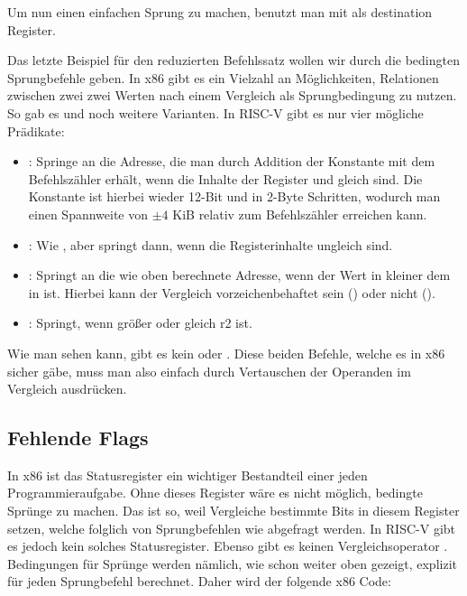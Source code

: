 Um nun einen einfachen Sprung zu machen, benutzt man  mit  als
destination Register.

Das letzte Beispiel für den reduzierten Befehlssatz wollen wir durch die
bedingten Sprungbefehle geben. In x86 gibt es ein Vielzahl an Möglichkeiten,
Relationen zwischen zwei zwei Werten nach einem Vergleich als Sprungbedingung zu
nutzen. So gab es  und noch weitere Varianten. In
RISC-V gibt es nur vier mögliche Prädikate:

\begin{itemize}
  \item {}: Springe an die Adresse, die man durch
    Addition der Konstante  mit dem Befehlszähler erhält, wenn
    die Inhalte der Register  und  gleich sind. Die Konstante
    ist hierbei wieder 12-Bit und in 2-Byte Schritten, wodurch man einen
    Spannweite von $\pm 4$ KiB relativ zum Befehlszähler erreichen kann.
  \item {}: Wie , aber springt dann, wenn
    die Registerinhalte ungleich sind.
  \item {}: Springt an die wie oben berechnete
    Adresse, wenn der Wert in  kleiner dem in  ist. Hierbei
    kann der Vergleich vorzeichenbehaftet sein () oder nicht
    ().
  \item {}: Springt, wenn  größer oder
    gleich r2 ist.
\end{itemize}

Wie man sehen kann, gibt es kein  oder . Diese beiden
Befehle, welche es in x86 sicher gäbe, muss man also einfach durch Vertauschen
der Operanden im Vergleich ausdrücken.

\subsection{Fehlende Flags}

In x86 ist das Statusregister ein wichtiger Bestandteil einer jeden
Programmieraufgabe. Ohne dieses Register wäre es nicht möglich, bedingte Sprünge
zu machen. Das ist so, weil Vergleiche bestimmte Bits in diesem Register setzen,
welche folglich von Sprungbefehlen wie  abgefragt werden. In RISC-V
gibt es jedoch kein solches Statusregister. Ebenso gibt es keinen
Vergleichsoperator . Bedingungen für Sprünge werden nämlich, wie schon
weiter oben gezeigt, explizit für jeden Sprungbefehl berechnet. Daher wird der
folgende x86 Code:

